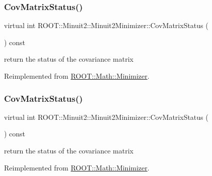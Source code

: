 \subsubsection{\texorpdfstring{CovMatrixStatus()}{CovMatrixStatus()}\hspace{0.1cm}{\footnotesize\ttfamily [1/3]}}
{\footnotesize\ttfamily virtual int R\+O\+O\+T\+::\+Minuit2\+::\+Minuit2\+Minimizer\+::\+Cov\+Matrix\+Status (\begin{DoxyParamCaption}{ }\end{DoxyParamCaption}) const\hspace{0.3cm}{\ttfamily [virtual]}}

return the status of the covariance matrix 

Reimplemented from \mbox{\hyperlink{classROOT_1_1Math_1_1Minimizer_a5f5eab490760ff361d9c44369e9d754d}{R\+O\+O\+T\+::\+Math\+::\+Minimizer}}.

\mbox{\label{classROOT_1_1Minuit2_1_1Minuit2Minimizer_ad9f4873b9651626d2b83cf7eab826b0f}} 
\subsubsection{\texorpdfstring{CovMatrixStatus()}{CovMatrixStatus()}\hspace{0.1cm}{\footnotesize\ttfamily [2/3]}}
{\footnotesize\ttfamily virtual int R\+O\+O\+T\+::\+Minuit2\+::\+Minuit2\+Minimizer\+::\+Cov\+Matrix\+Status (\begin{DoxyParamCaption}{ }\end{DoxyParamCaption}) const\hspace{0.3cm}{\ttfamily [virtual]}}

return the status of the covariance matrix 

Reimplemented from \mbox{\hyperlink{classROOT_1_1Math_1_1Minimizer_a5f5eab490760ff361d9c44369e9d754d}{R\+O\+O\+T\+::\+Math\+::\+Minimizer}}.

\mbox{\label{classROOT_1_1Minuit2_1_1Minuit2Minimizer_ad9f4873b9651626d2b83cf7eab826b0f}} 
